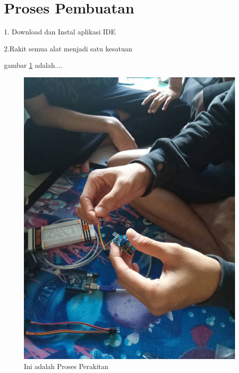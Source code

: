 \section{Proses Pembuatan}

1. Download dan Instal aplikasi IDE

2.Rakit semua alat menjadi satu kesatuan

  gambar \ref{ar2} adalah....
  \begin{figure}[ht]
  \centerline{\includegraphics[width=.75\textwidth]{figures/ar2.jpg}}
  \caption{Ini adalah Proses Perakitan}
  \label{ar2}
  \end{figure}


